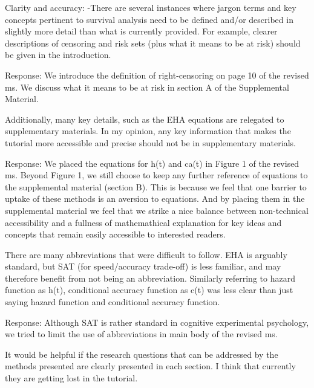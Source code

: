 \documentclass[
]{article}
\renewenvironment{quote}{\begin{leftbar}}{\end{leftbar}}
\begin{document}
\begin{quote}
Clarity and accuracy: -There are several instances where jargon terms
and key concepts pertinent to survival analysis need to be defined
and/or described in slightly more detail than what is currently
provided. For example, clearer descriptions of censoring and risk sets
(plus what it means to be at risk) should be given in the introduction.
\end{quote}

Response: We introduce the definition of right-censoring on page 10 of
the revised ms. We discuss what it means to be at risk in section A of
the Supplemental Material.

\begin{quote}
Additionally, many key details, such as the EHA equations are relegated
to supplementary materials. In my opinion, any key information that
makes the tutorial more accessible and precise should not be in
supplementary materials.
\end{quote}

Response: We placed the equations for h(t) and ca(t) in Figure 1 of the
revised ms. Beyond Figure 1, we still choose to keep any further
reference of equations to the supplemental material (section B). This is
because we feel that one barrier to uptake of these methods is an
aversion to equations. And by placing them in the supplemental material
we feel that we strike a nice balance between non-technical
accessibility and a fullness of mathemathical explanation for key ideas
and concepts that remain easily accessible to interested readers.

\begin{quote}
There are many abbreviations that were difficult to follow. EHA is
arguably standard, but SAT (for speed/accuracy trade-off) is less
familiar, and may therefore benefit from not being an abbreviation.
Similarly referring to hazard function as h(t), conditional accuracy
function as c(t) was less clear than just saying hazard function and
conditional accuracy function.
\end{quote}

Response: Although SAT is rather standard in cognitive experimental
psychology, we tried to limit the use of abbreviations in main body of
the revised ms.

\begin{quote}
It would be helpful if the research questions that can be addressed by
the methods presented are clearly presented in each section. I think
that currently they are getting lost in the tutorial.
\end{quote}
\end{document}

